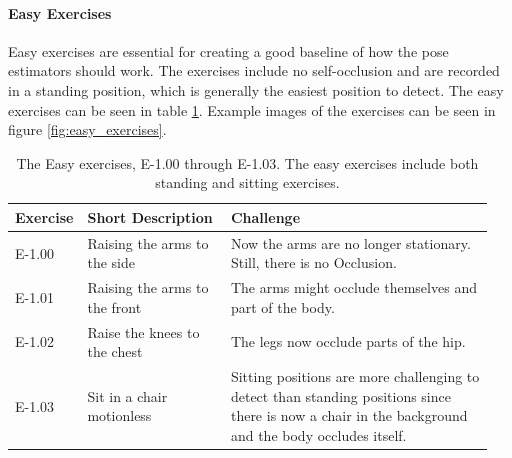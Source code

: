 \paragraph{Easy Exercises}

Easy exercises are essential for creating a good baseline of how the pose estimators should work. The exercises include no self-occlusion and are recorded in a standing position, which is generally the easiest position to detect. The easy exercises can be seen in table \ref{tab:easy_exercises}. Example images of the exercises can be seen in figure \ref{fig:easy_exercises}.

\begin{table}[ht]
  \caption[Easy Exercises]{The Easy exercises, E-1.00 through E-1.03. The easy exercises include both standing and sitting exercises.}
  \label{tab:easy_exercises}
  \begin{tabular}{p{0.1\linewidth}p{0.3\linewidth}p{0.55\linewidth}}
  \hline
  Exercise & Short Description             & Challenge \\ \hline
  E-1.00   & Raising the arms to the side  & Now the arms are no longer stationary. Still, there is no Occlusion. \\
  E-1.01   & Raising the arms to the front & The arms might occlude themselves and part of the body.  \\
  E-1.02   & Raise the knees to the chest  & The legs now occlude parts of the hip.  \\
  E-1.03   & Sit in a chair motionless     & Sitting positions are more challenging to detect than standing positions since there is now a chair in the background and the body occludes itself.\\ \hline
  \end{tabular}
  \end{table}

